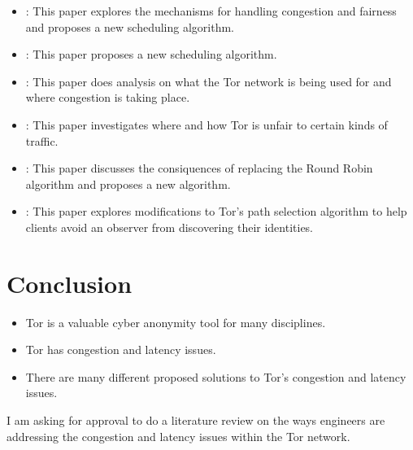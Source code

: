 \documentclass[letterpaper,12pt]{texMemo}
\begin{document}
\begin{itemize}
    \item
    \citeauthor*{unfair}: This paper explores the mechanisms for handling congestion
    and fairness and proposes a new scheduling algorithm.
    \item
    \citeauthor*{Tang}: This paper proposes a new scheduling algorithm.
    \item
    \citeauthor*{analysis}: This paper does analysis on what the Tor network is being used for and where congestion is taking place.
    \item
    \citeauthor*{delay}: This paper investigates where and how Tor is unfair to certain kinds of traffic.
    \item
    \citeauthor*{Bauer}: This paper discusses the consiquences of replacing the Round Robin algorithm and
    proposes a new algorithm.
    \item
    \citeauthor*{Edman}: This paper explores modifications to Tor's path selection algorithm to help
    clients avoid an observer from discovering their identities.
\end{itemize}


\section*{Conclusion}
\begin{itemize}
    \item
    Tor is a valuable cyber anonymity tool for many disciplines.
    \item
    Tor has congestion and latency issues.
    \item
    There are many different proposed solutions to Tor's congestion and latency issues.
\end{itemize}
I am asking for approval to do a literature review on the ways engineers are addressing the
congestion and latency issues within the Tor network.



\end{document}
